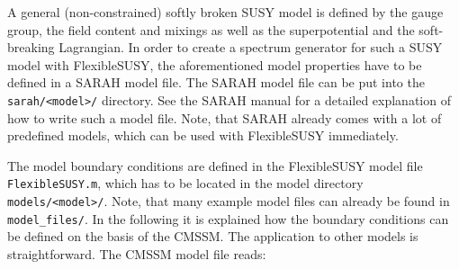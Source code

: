\documentclass[final,3p,11pt,pdflatex]{elsarticle}
\makeatletter
\newcommand{\fs}{FlexibleSUSY\@\xspace}
\newcommand{\code}[1]{\lstinline|#1|}  %
\makeatother
\begin{document}
A general (non-constrained) softly broken SUSY model is defined by the
gauge group, the field content and mixings as well as the
superpotential and the soft-breaking Lagrangian.  In order to create a
spectrum generator for such a SUSY model with \fs, the aforementioned
model properties have to be defined in a SARAH model file.  The SARAH
model file can be put into the \code{sarah/<model>/} directory.  See
the SARAH manual \cite{Staub:2008uz,Staub:2013tta} for a detailed
explanation of how to write such a model file.  Note, that SARAH
already comes with a lot of predefined models, which can be used with
\fs immediately.

The model boundary conditions are defined in the \fs model file
\code{FlexibleSUSY.m}, which has to be located in the model directory
\code{models/<model>/}.  Note, that many example model files can
already be found in \code{model_files/}.  In the following it is
explained how the boundary conditions can be defined on the basis of
the CMSSM.  The application to other models is straightforward.  The
CMSSM model file reads:
%
\end{document}
